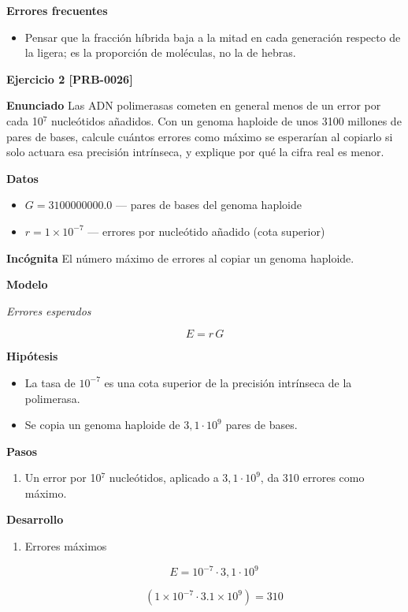 \documentclass{book}
\begin{document}
\noindent\textbf{Errores frecuentes}
\begin{itemize}
\item Pensar que la fracción híbrida baja a la mitad en cada generación respecto de la ligera; es la proporción de moléculas, no la de hebras.
\end{itemize}

\noindent\textbf{Ejercicio 2 [PRB-0026]}

\noindent\textbf{Enunciado}
Las ADN polimerasas cometen en general menos de un error por cada 10\({}^{7}\) nucleótidos añadidos. Con un genoma haploide de unos 3100 millones de pares de bases, calcule cuántos errores como máximo se esperarían al copiarlo si solo actuara esa precisión intrínseca, y explique por qué la cifra real es menor.


\noindent\textbf{Datos}
\begin{itemize}
\item $G = 3100000000.0$ — pares de bases del genoma haploide
\item $r = 1\times 10^{-7}$ — errores por nucleótido añadido (cota superior)
\end{itemize}

\noindent\textbf{Incógnita}
El número máximo de errores al copiar un genoma haploide.


\noindent\textbf{Modelo}

\noindent\textit{Errores esperados}

\[
E = r\,G
\]

\noindent\textbf{Hipótesis}
\begin{itemize}
\item La tasa de \(10^{-7}\) es una cota superior de la precisión intrínseca de la polimerasa.
\item Se copia un genoma haploide de \(3,1\cdot10^{9}\) pares de bases.
\end{itemize}

\noindent\textbf{Pasos}
\begin{enumerate}
\item
Un error por 10\({}^{7}\) nucleótidos, aplicado a \(3,1\cdot10^{9}\), da 310 errores como máximo.

\end{enumerate}

\noindent\textbf{Desarrollo}
\begin{enumerate}
\item
Errores máximos


\[
E = 10^{-7}\cdot 3{,}1\cdot 10^{9}
\]

\[
\left(1\times 10^{-7}\cdot 3.1\times 10^{9}\right) = 310
\]
\end{enumerate}
\end{document}
